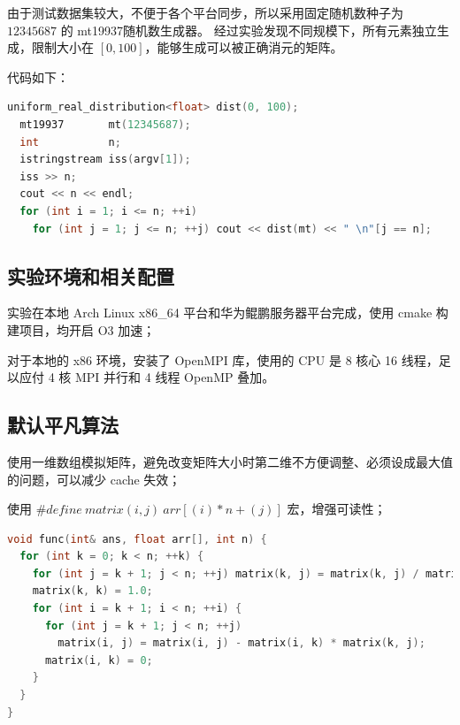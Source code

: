 \documentclass[a4paper]{article}
\begin{document}
由于测试数据集较大，不便于各个平台同步，所以采用固定随机数种子为 $12345687$ 的 mt19937随机数生成器。
经过实验发现不同规模下，所有元素独立生成，限制大小在 $[0, 100]$，能够生成可以被正确消元的矩阵。

代码如下：

\begin{lstlisting}[frame=trbl,language={C++}]
  uniform_real_distribution<float> dist(0, 100);
  mt19937       mt(12345687);
  int           n;
  istringstream iss(argv[1]);
  iss >> n;
  cout << n << endl;
  for (int i = 1; i <= n; ++i)
    for (int j = 1; j <= n; ++j) cout << dist(mt) << " \n"[j == n];
\end{lstlisting}

\subsection{实验环境和相关配置}

实验在本地 Arch Linux x86\_64 平台和华为鲲鹏服务器平台完成，使用 cmake 构建项目，均开启 O3 加速；

对于本地的 x86 环境，安装了 OpenMPI 库，使用的 CPU 是 8 核心 16 线程，足以应付 4 核 MPI 并行和 4 线程 OpenMP 叠加。

\subsection{默认平凡算法}

使用一维数组模拟矩阵，避免改变矩阵大小时第二维不方便调整、必须设成最大值的问题，可以减少 cache 失效；

使用 $\#define\ matrix(i, j)\ arr[(i) * n + (j)]$ 宏，增强可读性；

\begin{lstlisting}[frame=trbl,language={C++}]
void func(int& ans, float arr[], int n) {
  for (int k = 0; k < n; ++k) {
    for (int j = k + 1; j < n; ++j) matrix(k, j) = matrix(k, j) / matrix(k, k);
    matrix(k, k) = 1.0;
    for (int i = k + 1; i < n; ++i) {
      for (int j = k + 1; j < n; ++j)
        matrix(i, j) = matrix(i, j) - matrix(i, k) * matrix(k, j);
      matrix(i, k) = 0;
    }
  }
}
\end{lstlisting}
\end{document}
